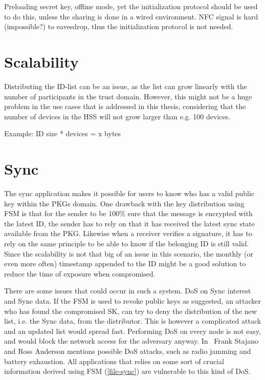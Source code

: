 Preloading secret key, offline mode, yet the initialization protocol should be used to do this, unless the sharing is done in a wired environment. 
\gls{NFC} signal is hard (impossible?) to eavesdrop, thus the initialization protocol is not needed. 


\section{Scalability}
Distributing the \gls{ID}-list can be an issue, as the list can grow linearly with the number of participants in the trust domain.
However, this might not be a huge problem in the use cases that is addressed in this thesis, considering that the number of devices in the \gls{HSS} will not grow larger than e.g. 100 devices. 

Example:
ID size * devices = x bytes 

\section{Sync}
The sync application makes it possible for users to know who has a valid public key within the \gls{PKG}s domain.
One drawback with the key distribution using \gls{FSM} is that for the sender to be 100\% sure that the message is encrypted with the latest \gls{ID}, the sender has to rely on that it has received the latest sync state available from the \gls{PKG}.
Likewise when a \gls{receiver} verifies a signature, it has to rely on the same principle to be able to know if the belonging \gls{ID} is still valid.
Since the scalability is not that big of an issue in this scenario, the monthly (or even more often) timestamp appended to the \gls{ID} might be a good solution to reduce the time of exposure when compromised.

There are some issues that could occur in such a system. 
\gls{DoS} on Sync \gls{interest} and Sync \gls{data}. 
If the \gls{FSM} is used to revoke public keys as suggested, an attacker who has found the compromised \gls{SK}, can try to deny the distribution of the new list, i.e. the Sync \gls{data}, from the distributor. 
This is however a complicated attack and an updated list would spread fast.
Performing \gls{DoS} on every node is not easy, and would block the network access for the adversary anyway.
In~\cite{DBLP:conf/spw/StajanoA99} Frank Stajano and Ross Anderson mentions possible \gls{DoS} attacks, such as radio jamming and battery exhaustion. 
All applications that relies on some sort of crucial information derived using \gls{FSM} (\autoref{file-sync}) are vulnerable to this kind of \gls{DoS}.

